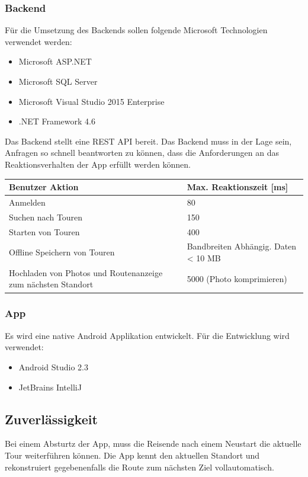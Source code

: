 \documentclass[a4paper,10pt,xetex]{article}
\begin{document}
\subsubsection{Backend}\label{backend}
Für die Umsetzung des Backends sollen folgende Microsoft Technologien
verwendet werden:

\begin{itemize}
  \item Microsoft ASP.NET
  \item Microsoft SQL Server
  \item Microsoft Visual Studio 2015 Enterprise
  \item .NET Framework 4.6
\end{itemize}

Das Backend stellt eine REST API bereit. Das Backend muss in der Lage
sein, Anfragen so schnell beantworten zu können, dass die Anforderungen
an das Reaktionsverhalten der App erfüllt werden können.

\begin{longtabu} to \textwidth { | X[l] | l | }
\hline
\textbf{Benutzer Aktion} & \textbf{Max. Reaktionszeit {[}ms{]}}\\\hline
\endhead

Anmelden & 80\\\hline
Suchen nach Touren & 150\\\hline
Starten von Touren & 400\\\hline
Offline Speichern von Touren & Bandbreiten Abhängig. Daten \textless{} 10 MB\\\hline
Hochladen von Photos und Routenanzeige zum nächsten Standort & 5000 (Photo komprimieren)\\\hline
\end{longtabu}


\subsubsection{App}\label{app}
Es wird eine native Android Applikation entwickelt. Für die Entwicklung
wird verwendet:

\begin{itemize}
  \item Android Studio 2.3
  \item JetBrains IntelliJ
\end{itemize}


\subsection{Zuverlässigkeit}\label{zuverluxe4ssigkeit}
Bei einem Absturtz der App, muss die Reisende nach einem Neustart die
aktuelle Tour weiterführen können. Die App kennt den aktuellen Standort
und rekonstruiert gegebenenfalls die Route zum nächsten Ziel
vollautomatisch.
\end{document}
